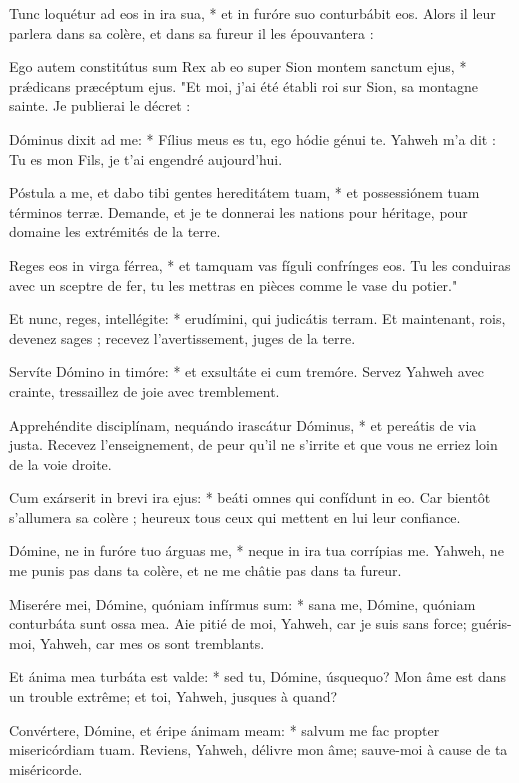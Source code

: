 \begin{paracol}{2}
\LigneParacol
{Tunc loquétur ad eos in ira sua, * et in furóre suo conturbábit eos.}
{Alors il leur parlera dans sa colère, et dans sa fureur il les épouvantera : }

\LigneParacol
{Ego autem constitútus sum Rex ab eo super Sion montem sanctum ejus, * prǽdicans præcéptum ejus.}
{"Et moi, j'ai été établi roi sur Sion, sa montagne sainte. Je publierai le décret :}

\LigneParacol
{Dóminus dixit ad me: * Fílius meus es tu, ego hódie génui te.}
{Yahweh m'a dit : Tu es mon Fils, je t'ai engendré aujourd'hui. }

\LigneParacol
{Póstula a me, et dabo tibi gentes hereditátem tuam, * et possessiónem tuam términos terræ.}
{Demande, et je te donnerai les nations pour héritage, pour domaine les extrémités de la terre. }

\LigneParacol
{Reges eos in virga férrea, * et tamquam vas fíguli confrínges eos.}
{Tu les conduiras avec un sceptre de fer, tu les mettras en pièces comme le vase du potier." }

\LigneParacol
{Et nunc, reges, intellégite: * erudímini, qui judicátis terram.}
{Et maintenant, rois, devenez sages ; recevez l'avertissement, juges de la terre. }

\LigneParacol
{Servíte Dómino in timóre: * et exsultáte ei cum tremóre.}
{Servez Yahweh avec crainte, tressaillez de joie avec tremblement. }

\LigneParacol
{Apprehéndite disciplínam, nequándo irascátur Dóminus, * et pereátis de via justa.}
{Recevez l'enseignement, de peur qu'il ne s'irrite et que vous ne erriez loin de la voie droite.}

\LigneParacol
{Cum exárserit in brevi ira ejus: * beáti omnes qui confídunt in eo.}
{Car bientôt s'allumera sa colère ; heureux tous ceux qui mettent en lui leur confiance. }

\LigneParacol
{Dómine, ne in furóre tuo árguas me, * neque in ira tua corrípias me.}
{Yahweh, ne me punis pas dans ta colère, et ne me châtie pas dans ta fureur. }

\LigneParacol
{Miserére mei, Dómine, quóniam infírmus sum: * sana me, Dómine, quóniam conturbáta sunt ossa mea.}
{Aie pitié de moi, Yahweh, car je suis sans force; guéris-moi, Yahweh, car mes os sont tremblants. }

\LigneParacol
{Et ánima mea turbáta est valde: * sed tu, Dómine, úsquequo?}
{Mon âme est dans un trouble extrême; et toi, Yahweh, jusques à quand? }

\LigneParacol
{Convértere, Dómine, et éripe ánimam meam: * salvum me fac propter misericórdiam tuam.}
{Reviens, Yahweh, délivre mon âme; sauve-moi à cause de ta miséricorde. }


\end{paracol}
